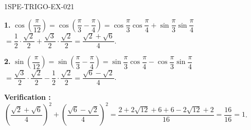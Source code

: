 \begin{corrige}{1SPE-TRIGO-EX-021}

\textbf{1.} $\cos\!\left(\dfrac{\pi}{12}\right) = \cos\!\left(\dfrac{\pi}{3}-\dfrac{\pi}{4}\right) = \cos\dfrac{\pi}{3}\cos\dfrac{\pi}{4} + \sin\dfrac{\pi}{3}\sin\dfrac{\pi}{4}$
$= \dfrac{1}{2}\cdot\dfrac{\sqrt{2}}{2} + \dfrac{\sqrt{3}}{2}\cdot\dfrac{\sqrt{2}}{2} = \dfrac{\sqrt{2}+\sqrt{6}}{4}$.

\textbf{2.} $\sin\!\left(\dfrac{\pi}{12}\right) = \sin\!\left(\dfrac{\pi}{3}-\dfrac{\pi}{4}\right) = \sin\dfrac{\pi}{3}\cos\dfrac{\pi}{4} - \cos\dfrac{\pi}{3}\sin\dfrac{\pi}{4}$
$= \dfrac{\sqrt{3}}{2}\cdot\dfrac{\sqrt{2}}{2} - \dfrac{1}{2}\cdot\dfrac{\sqrt{2}}{2} = \dfrac{\sqrt{6}-\sqrt{2}}{4}$.

\textbf{Verification :} $\left(\dfrac{\sqrt{2}+\sqrt{6}}{4}\right)^2 + \left(\dfrac{\sqrt{6}-\sqrt{2}}{4}\right)^2 = \dfrac{2+2\sqrt{12}+6+6-2\sqrt{12}+2}{16} = \dfrac{16}{16} = 1$. \checkmark

\end{corrige}
